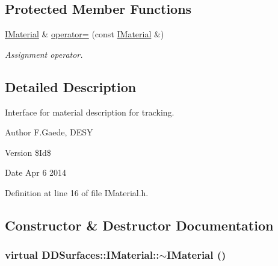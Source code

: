 \subsection*{Protected Member Functions}
\begin{DoxyCompactItemize}
\item 
\hyperlink{class_d_d_surfaces_1_1_i_material}{IMaterial} \& \hyperlink{class_d_d_surfaces_1_1_i_material_ad50224941bead73447e93594edaaad04}{operator=} (const \hyperlink{class_d_d_surfaces_1_1_i_material}{IMaterial} \&)
\begin{DoxyCompactList}\small\item\em Assignment operator. \item\end{DoxyCompactList}\end{DoxyCompactItemize}


\subsection{Detailed Description}
Interface for material description for tracking.

\begin{DoxyAuthor}{Author}
F.Gaede, DESY 
\end{DoxyAuthor}
\begin{DoxyVersion}{Version}
\$Id\$ 
\end{DoxyVersion}
\begin{DoxyDate}{Date}
Apr 6 2014 
\end{DoxyDate}


Definition at line 16 of file IMaterial.h.

\subsection{Constructor \& Destructor Documentation}
\hypertarget{class_d_d_surfaces_1_1_i_material_ac285cbca4d2083eefe1265970e671583}{
\subsubsection[{$\sim$IMaterial}]{\setlength{\rightskip}{0pt plus 5cm}virtual DDSurfaces::IMaterial::$\sim$IMaterial ()}}
\label{class_d_d_surfaces_1_1_i_material_ac285cbca4d2083eefe1265970e671583}


